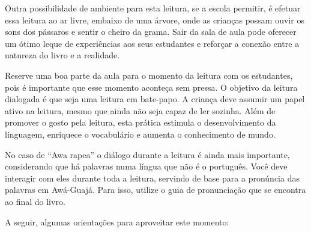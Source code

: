\documentclass[11pt]{extarticle}
\begin{document}

Outra possibilidade de ambiente para esta leitura, se a escola permitir, 
é efetuar essa leitura ao ar livre, embaixo de uma árvore, onde as crianças 
possam ouvir os sons dos pássaros e sentir o cheiro da grama. Sair da sala 
de aula pode oferecer um ótimo leque de experiências aos seus estudantes e 
reforçar a conexão entre a natureza do livro e a realidade.  

Reserve uma boa parte da aula para o momento da leitura com os estudantes, 
pois é importante que esse momento aconteça sem pressa. O objetivo da 
leitura dialogada é que seja uma leitura em bate-papo. A criança deve 
assumir um papel ativo na leitura, mesmo que ainda não seja capaz de 
ler sozinha. Além de promover o gosto pela leitura, esta prática estimula 
o desenvolvimento da linguagem, enriquece o vocabulário e 
aumenta o conhecimento de mundo.

No caso de ``Awa rapea'' o diálogo durante a leitura é 
ainda mais importante, considerando que há palavras numa língua que não é o português. 
Você deve interagir com eles durante toda a 
leitura, servindo de base para a pronúncia das palavras em Awá-Guajá.
Para isso, utilize o guia de pronunciação que se encontra ao final do livro.

A seguir, algumas orientações para aproveitar este momento: 
\end{document}
